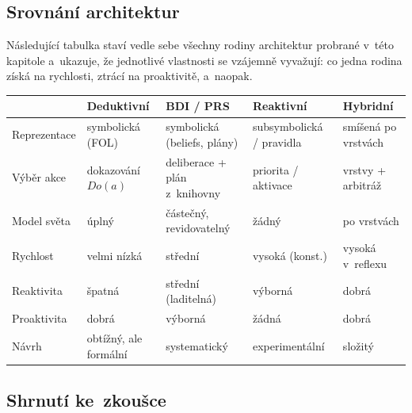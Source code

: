 \documentclass[11pt,a4paper]{article}
\theoremstyle{definition}
\begin{document}
\subsection{Srovnání architektur}

Následující tabulka staví vedle sebe všechny rodiny architektur probrané v~této kapitole
a~ukazuje, že jednotlivé vlastnosti se vzájemně vyvažují: co jedna rodina získá na rychlosti,
ztrácí na proaktivitě, a~naopak.

\begin{center}
\small
\begin{tabular}{@{}p{}
  >{\raggedright\arraybackslash}p{}
  >{\raggedright\arraybackslash}p{}
  >{\raggedright\arraybackslash}p{}
  >{\raggedright\arraybackslash}p{}@{}}
\toprule
& \textbf{Deduktivní} & \textbf{BDI / PRS} & \textbf{Reaktivní} & \textbf{Hybridní} \\
\midrule
Reprezentace & symbolická (FOL) & symbolická (beliefs, plány) & subsymbolická / pravidla
  & smíšená po vrstvách \\
Výběr akce & dokazování $\mathit{Do}(a)$ & deliberace + plán z~knihovny
  & priorita / aktivace & vrstvy + arbitráž \\
Model světa & úplný & částečný, revidovatelný & žádný & po vrstvách \\
Rychlost & velmi nízká & střední & vysoká (konst.) & vysoká v~reflexu \\
Reaktivita & špatná & střední (laditelná) & výborná & dobrá \\
Proaktivita & dobrá & výborná & žádná & dobrá \\
Návrh & obtížný, ale formální & systematický & experimentální & složitý \\
\bottomrule
\end{tabular}
\end{center}


\subsection{Shrnutí ke~zkoušce}
\end{document}
